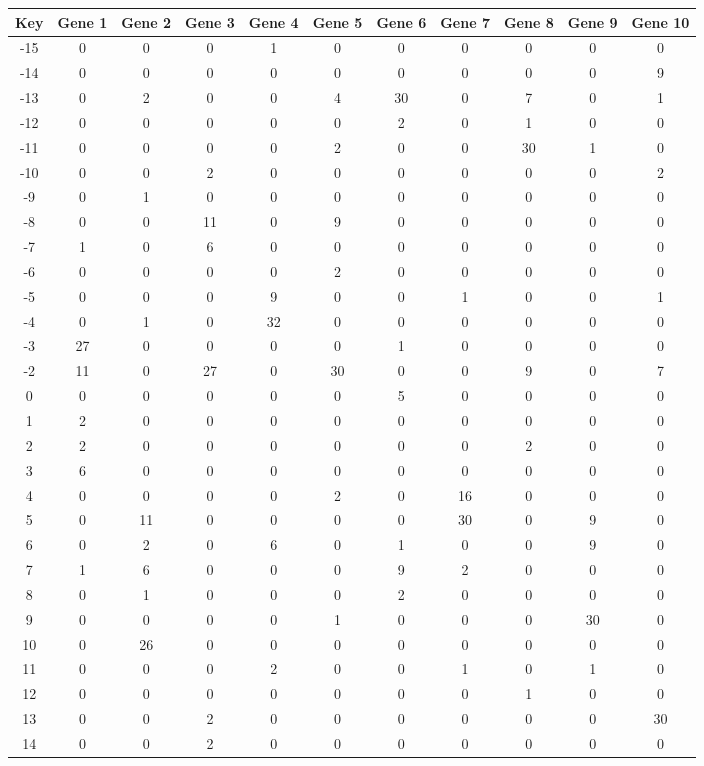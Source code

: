 \begin{tabular}{|c|c|c|c|c|c|c|c|c|c|c|}
\hline
Key & Gene 1 & Gene 2 & Gene 3 & Gene 4 & Gene 5 & Gene 6 & Gene 7 & Gene 8 & Gene 9 & Gene 10 \\
\hline
-15 & 0 & 0 & 0 & 1 & 0 & 0 & 0 & 0 & 0 & 0 \\
-14 & 0 & 0 & 0 & 0 & 0 & 0 & 0 & 0 & 0 & 9 \\
-13 & 0 & 2 & 0 & 0 & 4 & 30 & 0 & 7 & 0 & 1 \\
-12 & 0 & 0 & 0 & 0 & 0 & 2 & 0 & 1 & 0 & 0 \\
-11 & 0 & 0 & 0 & 0 & 2 & 0 & 0 & 30 & 1 & 0 \\
-10 & 0 & 0 & 2 & 0 & 0 & 0 & 0 & 0 & 0 & 2 \\
-9 & 0 & 1 & 0 & 0 & 0 & 0 & 0 & 0 & 0 & 0 \\
-8 & 0 & 0 & 11 & 0 & 9 & 0 & 0 & 0 & 0 & 0 \\
-7 & 1 & 0 & 6 & 0 & 0 & 0 & 0 & 0 & 0 & 0 \\
-6 & 0 & 0 & 0 & 0 & 2 & 0 & 0 & 0 & 0 & 0 \\
-5 & 0 & 0 & 0 & 9 & 0 & 0 & 1 & 0 & 0 & 1 \\
-4 & 0 & 1 & 0 & 32 & 0 & 0 & 0 & 0 & 0 & 0 \\
-3 & 27 & 0 & 0 & 0 & 0 & 1 & 0 & 0 & 0 & 0 \\
-2 & 11 & 0 & 27 & 0 & 30 & 0 & 0 & 9 & 0 & 7 \\
0 & 0 & 0 & 0 & 0 & 0 & 5 & 0 & 0 & 0 & 0 \\
1 & 2 & 0 & 0 & 0 & 0 & 0 & 0 & 0 & 0 & 0 \\
2 & 2 & 0 & 0 & 0 & 0 & 0 & 0 & 2 & 0 & 0 \\
3 & 6 & 0 & 0 & 0 & 0 & 0 & 0 & 0 & 0 & 0 \\
4 & 0 & 0 & 0 & 0 & 2 & 0 & 16 & 0 & 0 & 0 \\
5 & 0 & 11 & 0 & 0 & 0 & 0 & 30 & 0 & 9 & 0 \\
6 & 0 & 2 & 0 & 6 & 0 & 1 & 0 & 0 & 9 & 0 \\
7 & 1 & 6 & 0 & 0 & 0 & 9 & 2 & 0 & 0 & 0 \\
8 & 0 & 1 & 0 & 0 & 0 & 2 & 0 & 0 & 0 & 0 \\
9 & 0 & 0 & 0 & 0 & 1 & 0 & 0 & 0 & 30 & 0 \\
10 & 0 & 26 & 0 & 0 & 0 & 0 & 0 & 0 & 0 & 0 \\
11 & 0 & 0 & 0 & 2 & 0 & 0 & 1 & 0 & 1 & 0 \\
12 & 0 & 0 & 0 & 0 & 0 & 0 & 0 & 1 & 0 & 0 \\
13 & 0 & 0 & 2 & 0 & 0 & 0 & 0 & 0 & 0 & 30 \\
14 & 0 & 0 & 2 & 0 & 0 & 0 & 0 & 0 & 0 & 0 \\
\hline
\end{tabular}